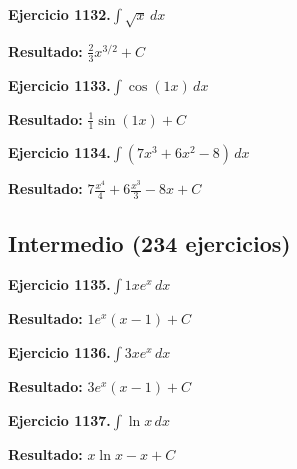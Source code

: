 \documentclass[10pt,a4paper]{article}
\begin{document}
\newpage
\begin{ejbox}
\textbf{Ejercicio 1132.}\quad $\int \sqrt{x}\,dx$
\end{ejbox}

\begin{solbox}
\textbf{Resultado:} \(\displaystyle \frac{2}{3}x^{3/2} + C\)
\end{solbox}

\begin{ejbox}
\textbf{Ejercicio 1133.}\quad $\int \cos(1x)\,dx$
\end{ejbox}

\begin{solbox}
\textbf{Resultado:} \(\displaystyle \frac{1}{1}\sin(1x) + C\)
\end{solbox}

\begin{ejbox}
\textbf{Ejercicio 1134.}\quad $\int (7x^3 +6x^2 -8)\,dx$
\end{ejbox}

\begin{solbox}
\textbf{Resultado:} \(\displaystyle 7\frac{x^4}{4} +6\frac{x^3}{3} -8x + C\)
\end{solbox}

\newpage
\newpage
\subsection{Intermedio (234 ejercicios)}

\begin{ejbox}
\textbf{Ejercicio 1135.}\quad $\int 1x e^{x}\,dx$
\end{ejbox}

\begin{solbox}
\textbf{Resultado:} \(\displaystyle 1e^x(x-1) + C\)
\end{solbox}

\begin{ejbox}
\textbf{Ejercicio 1136.}\quad $\int 3x e^{x}\,dx$
\end{ejbox}

\begin{solbox}
\textbf{Resultado:} \(\displaystyle 3e^x(x-1) + C\)
\end{solbox}

\begin{ejbox}
\textbf{Ejercicio 1137.}\quad $\int \ln x\,dx$
\end{ejbox}

\begin{solbox}
\textbf{Resultado:} \(\displaystyle x\ln x - x + C\)
\end{solbox}
\end{document}
